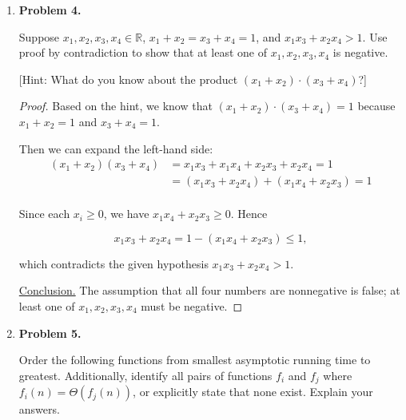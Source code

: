 \documentclass[11pt]{article}
\begin{document}
\begin{enumerate}
\begin{proof}[\underline{Proof}]
\[
\begin{aligned}
    \sum_{i=0}^{n+1} 2^i &= 2^0 + 2^1 + 2^2 + \ldots + 2^n + 2^{n+1} \\
    &= \sum_{i=0}^{n+1} 2^i + 2^{n+1} \\
    &= (2^{n+1} - 1) + 2^{n+1}\\
    &= 2(2^{n+1}) - 1 = 2^{n+2} - 1
\end{aligned}
\]

We shows that LSH = RHS.

\underline{Conclusion.} \(\displaystyle\sum_{i=0}^{n} 2^i = 2^{n+1} - 1\) holds for all natural numbers \(n \in \mathbb{N}\).

\end{proof}

\item
\textbf{Problem 4.}

Suppose \(x_1, x_2, x_3, x_4 \in \mathbb{R}\), \(x_1 + x_2 = x_3 + x_4 = 1\), and \(x_1x_3 + x_2x_4 >1\). Use proof by contradiction to show that at least one of \(x_1, x_2, x_3, x_4\) is negative.

[Hint: What do you know about the product \((x_1 + x_2)\cdot(x_3 + x_4)\)?]

\begin{proof}

Based on the hint, we know that \((x_1 + x_2)\cdot(x_3 + x_4) = 1\) because \(x_1 + x_2 = 1\) and \(x_3 + x_4 = 1\).

Then we can expand the left-hand side:
\[
\begin{aligned}
(x_1 + x_2)(x_3 + x_4) &= x_1x_3 + x_1x_4 + x_2x_3 + x_2x_4 = 1\\
&= (x_1x_3 + x_2x_4) + (x_1x_4 + x_2x_3) = 1\\
\end{aligned}
\]

Since each \(x_i \ge 0\), we have \(x_1x_4 + x_2x_3 \ge 0\). Hence

\[x_1x_3+x_2x_4 = 1-(x_1x_4+x_2x_3) \le 1,\]

which contradicts the given hypothesis \(x_1x_3+x_2x_4>1\).

\underline{Conclusion.} The assumption that all four numbers are nonnegative is false; at least one of $x_1,x_2,x_3,x_4$ must be negative.

\end{proof}

\item
\textbf{Problem 5.}

Order the following functions from smallest asymptotic running time to greatest. Additionally, identify all pairs of functions \(f_i\) and \(f_j\) where \(f_i(n) = \Theta(f_j (n))\), or explicitly state that none exist. Explain your answers.


\end{enumerate}
\end{document}
